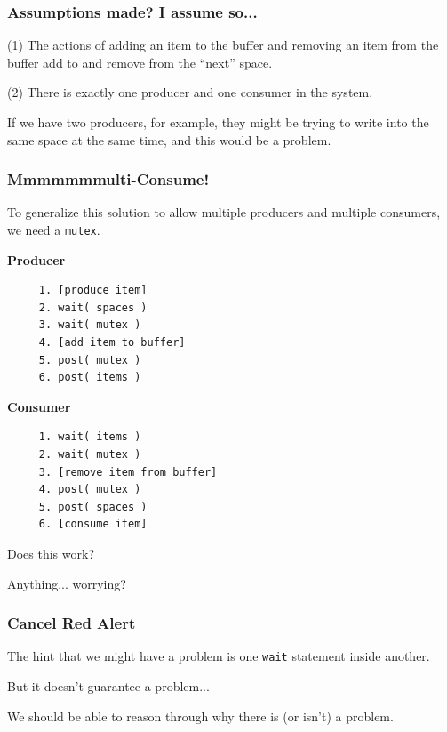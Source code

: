 \begin{frame}
\frametitle{Assumptions made? I assume so...}

(1) The actions of adding an item to the buffer and removing an item from the buffer add to and remove from the ``next'' space.

(2) There is exactly one producer and one consumer in the system. 

If we have two producers, for example, they might be trying to write into the same space at the same time, and this would be a problem. 


\end{frame}


\begin{frame}[fragile]
\frametitle{Mmmmmmmulti-Consume!}

To generalize this solution to allow multiple producers and multiple consumers, we need a \texttt{mutex}.

\begin{multicols}{2}
\textbf{Producer}
  \begin{verbatim}
	 1. [produce item]
	 2. wait( spaces )
	 3. wait( mutex )
	 4. [add item to buffer]
	 5. post( mutex )
	 6. post( items )
  \end{verbatim}
\columnbreak
\textbf{Consumer}
  \begin{verbatim}
	 1. wait( items )
	 2. wait( mutex )
	 3. [remove item from buffer]
	 4. post( mutex )
	 5. post( spaces )
	 6. [consume item]
  \end{verbatim}
\end{multicols}
\vspace{-2em}

Does this work?

Anything... worrying?

\end{frame}


\begin{frame}
\frametitle{Cancel Red Alert}

The hint that we might have a problem is one \texttt{wait} statement inside another.

But it doesn't guarantee a problem...

We should be able to reason through why there is (or isn't) a problem.

\end{frame}

